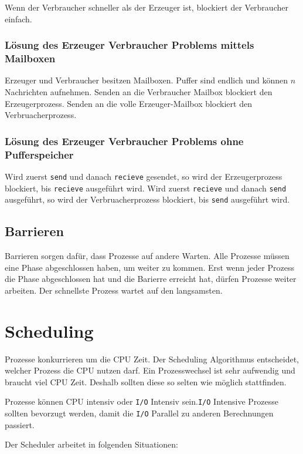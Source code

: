 Wenn der Verbraucher schneller als der Erzeuger ist, blockiert der Verbraucher einfach.

\subsubsection{Lösung des Erzeuger Verbraucher Problems mittels Mailboxen}

Erzeuger und Verbraucher besitzen Mailboxen. Puffer sind endlich und können $n$ Nachrichten aufnehmen. Senden an die Verbraucher Mailbox blockiert den Erzeugerprozess. Senden an die volle Erzeuger-Mailbox blockiert den Verbruacherprozess.

\subsubsection{Lösung des Erzeuger Verbraucher Problems ohne Pufferspeicher}

Wird zuerst \texttt{send} und danach \texttt{recieve} gesendet, so wird der Erzeugerprozess blockiert, bis \texttt{recieve} ausgeführt wird. Wird zuerst \texttt{recieve} und danach \texttt{send} ausgeführt, so wird der Verbruacherprozess blockiert, bis \texttt{send} ausgeführt wird.

\subsection{Barrieren}

Barrieren sorgen dafür, dass Prozesse auf andere Warten. Alle Prozesse müssen eine Phase abgeschlossen haben, um weiter zu kommen. Erst wenn jeder Prozess die Phase abgeschlossen hat und die Barierre erreicht hat, dürfen Prozesse weiter arbeiten. Der schnellste Prozess wartet auf den langsamsten.

\section{Scheduling}

Prozesse konkurrieren um die CPU Zeit. Der Scheduling Algorithmus entscheidet, welcher Prozess die CPU nutzen darf. Ein Prozesswechsel ist sehr aufwendig und braucht viel CPU Zeit. Deshalb sollten diese so selten wie möglich stattfinden.

Prozesse können CPU intensiv oder \texttt{I/O} Intensiv sein.\texttt{I/O} Intensive Prozesse sollten bevorzugt werden, damit die \texttt{I/O} Parallel zu anderen Berechnungen passiert.

Der Scheduler arbeitet in folgenden Situationen:

